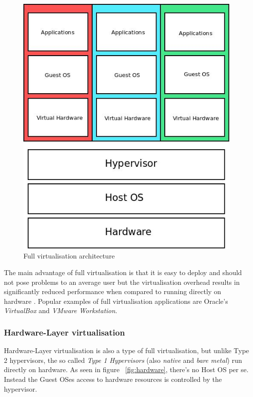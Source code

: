 \begin{figure}[ht!]
\centering
  \includegraphics[width=\textwidth, keepaspectratio]{fullvirt.jpeg}%
  \caption{Full virtualisation architecture}
  \label{fig:full}
\end{figure}

The main advantage of full virtualisation is that it is easy to deploy and should not pose problems to an average user but the virtualisation overhead results in significantly reduced performance when compared to running directly on hardware \cite{taxonomy}. Popular examples of full virtualisation applications are Oracle's \textit{VirtualBox}\cite{VirtualBox} and \textit{VMware Workstation}\cite{WorkStation}. 

\subsubsection{Hardware-Layer virtualisation}

Hardware-Layer virtualisation is also a type of full virtualisation, but unlike Type 2 hypervisors, the so called \textit{Type 1 Hypervisors} (also \textit{native} and \textit{bare metal}) run directly on hardware. As seen in figure ~\ref{fig:hardware}, there's no Host OS per se. Instead the Guest OSes access to hardware resources is controlled by the hypervisor.

